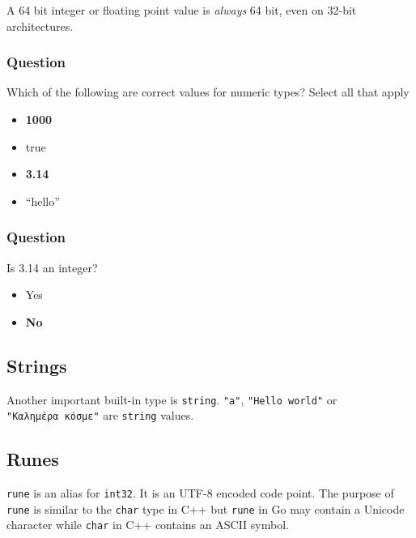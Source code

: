 \documentclass[]{book}
\providecommand{\tightlist}{%
  \setlength{\itemsep}{0pt}\setlength{\parskip}{0pt}}
\let\BeginKnitrBlock\begin \let\EndKnitrBlock\end
\begin{document}
\BeginKnitrBlock{rmdnote}
A 64 bit integer or floating point value is \emph{always} 64 bit, even on 32-bit
architectures.
\EndKnitrBlock{rmdnote}

\hypertarget{question-6}{%
\subsubsection*{Question}\label{question-6}}

Which of the following are correct values for numeric types? Select all that
apply

\begin{itemize}
\tightlist
\item
  \textbf{1000}
\item
  true
\item
  \textbf{3.14}
\item
  ``hello''
\end{itemize}

\hypertarget{question-7}{%
\subsubsection*{Question}\label{question-7}}

Is 3.14 an integer?

\begin{itemize}
\tightlist
\item
  Yes
\item
  \textbf{No}
\end{itemize}

\hypertarget{strings}{%
\subsection{Strings}\label{strings}}

Another important built-in type is \texttt{string}. \texttt{"a"}, \texttt{"Hello\ world"} or
\texttt{"Καλημέρα\ κόσμε"} are \texttt{string} values.

\hypertarget{runes}{%
\subsection{Runes}\label{runes}}

\texttt{rune} is an alias for \texttt{int32}. It is an UTF-8 encoded code point. The purpose
of \texttt{rune} is similar to the \texttt{char} type in C++ but \texttt{rune} in Go may contain a
Unicode character while \texttt{char} in C++ contains an ASCII symbol.
\end{document}
